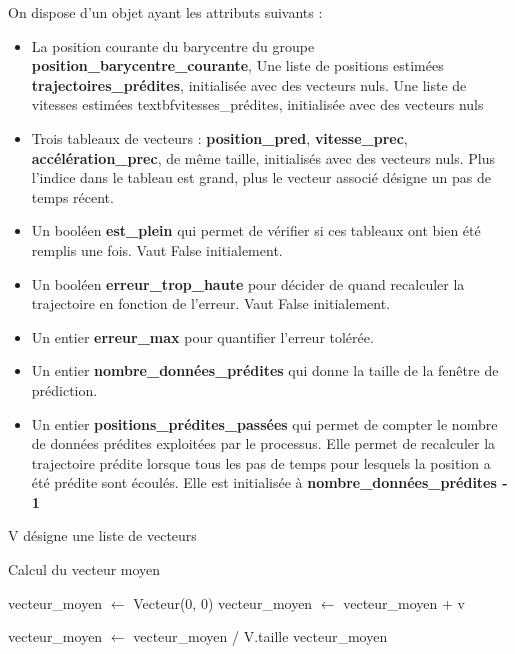\documentclass{article}
\begin{document}
On dispose d’un objet ayant les attributs suivants :
\begin{itemize}
    \item La position courante du barycentre du groupe \textbf{position\_barycentre\_courante},
          Une liste de positions estimées \textbf{trajectoires\_prédites}, initialisée avec des vecteurs nuls.
          Une liste de vitesses estimées textbf{vitesses\_prédites}, initialisée avec des vecteurs nuls

    \item Trois tableaux de vecteurs : \textbf{position\_pred}, \textbf{vitesse\_prec}, \textbf{accélération\_prec}, de même taille, initialisés avec des vecteurs nuls. Plus l’indice dans le tableau est grand, plus le vecteur associé désigne un pas de temps récent.

    \item Un booléen \textbf{est\_plein} qui permet de vérifier si ces tableaux ont bien été remplis une fois. Vaut False initialement.

    \item Un booléen \textbf{erreur\_trop\_haute} pour décider de quand recalculer la trajectoire en fonction de l’erreur. Vaut False initialement.

    \item Un entier \textbf{erreur\_max} pour quantifier l’erreur tolérée.

    \item Un entier \textbf{nombre\_données\_prédites} qui donne la taille de la fenêtre de prédiction.

    \item Un entier \textbf{positions\_prédites\_passées} qui permet de compter le nombre de données prédites exploitées par le processus. Elle permet de recalculer la trajectoire prédite lorsque tous les pas de temps pour lesquels la position a été prédite sont écoulés. Elle est initialisée à \textbf{nombre\_données\_prédites - 1}

\end{itemize}

V désigne une liste de vecteurs

\begin{algorithm}[H]
    \caption{Calcul du vecteur moyen}
    \begin{algorithmic}
        \STATE vecteur\_moyen $\leftarrow$ Vecteur(0, 0)
        \medbreak
        \STATE vecteur\_moyen $\leftarrow$ vecteur\_moyen + v
        \ENDFOR

        \medbreak

        \STATE vecteur\_moyen $\leftarrow$ vecteur\_moyen / V.taille
        \medbreak
        \RETURN vecteur\_moyen

    \end{algorithmic}
\end{algorithm}
\end{document}
